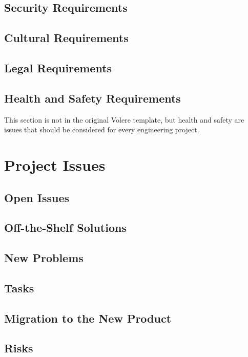 \documentclass[12pt, titlepage]{article}
\begin{document}
\subsection{Security Requirements}

\subsection{Cultural Requirements}

\subsection{Legal Requirements}

\subsection{Health and Safety Requirements}

This section is not in the original Volere template, but health and safety are
issues that should be considered for every engineering project.

\section{Project Issues}

\subsection{Open Issues}

\subsection{Off-the-Shelf Solutions}

\subsection{New Problems}

\subsection{Tasks}

\subsection{Migration to the New Product}

\subsection{Risks}
\end{document}
